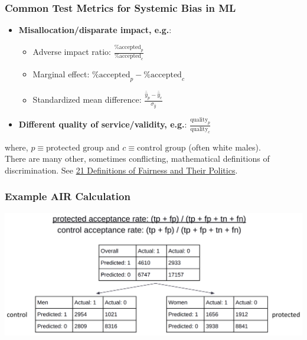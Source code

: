 \documentclass[11pt,aspectratio=169,hyperref={colorlinks}]{beamer}
\begin{document}
		\begin{frame}				
		
			\frametitle{Common Test Metrics for Systemic Bias in ML}
			
			\begin{itemize}
				\item \textbf{Misallocation/disparate impact, e.g.}:			
						\begin{itemize}\small
							\item Adverse impact ratio: $\frac{\text{\% accepted}_p }{ \text{\% accepted}_c}$ 
							\item Marginal effect: $\text{\% accepted}_p - \text{\% accepted}_c$
							\item Standardized mean difference: $\frac{\bar{\hat{y}}_p - \bar{\hat{y}}_c}{\sigma_{\hat{y}}}$
						\end{itemize}
				\item \textbf{Different quality of service/validity, e.g.}: $\frac{\text{quality}_p}{\text{quality}_c}$
			\end{itemize}
			\noindent 
			\scriptsize{where, $p \equiv \text{protected group}$ and $c \equiv \text{control group}$ (often white males).}\\
			\vspace{5pt}
			\normalsize{There are many other, sometimes conflicting, mathematical definitions of discrimination. 
				See \href{https://www.youtube.com/watch?v=wqamrPkF5kk}{21 Definitions of Fairness and Their Politics}.}
			
		\end{frame}

		\begin{frame}				
		
			\frametitle{Example AIR Calculation}
			
			\centering
			\includegraphics[scale=0.15]{../img/air1.png}
			
		\end{frame}	
\end{document}
